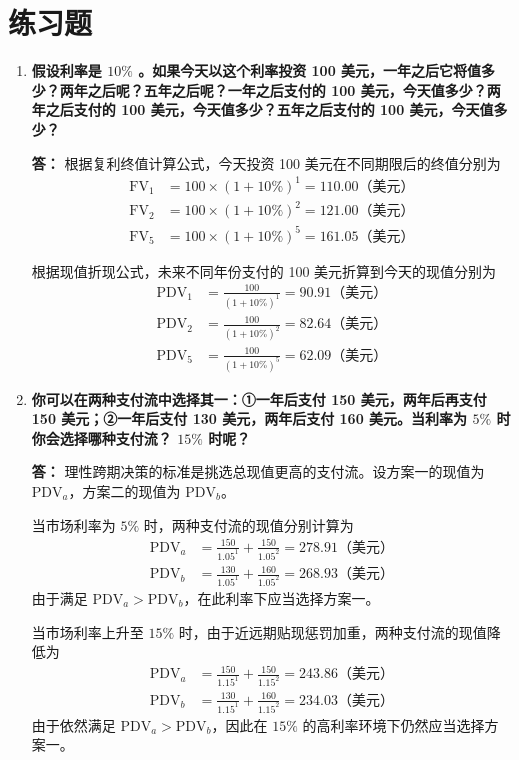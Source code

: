 	\section{练习题}
	\begin{enumerate}[label=\textbf{\arabic*.}, leftmargin=*]
		\item \textbf{假设利率是 $10\%$ 。如果今天以这个利率投资 100 美元，一年之后它将值多少？两年之后呢？五年之后呢？一年之后支付的 100 美元，今天值多少？两年之后支付的 100 美元，今天值多少？五年之后支付的 100 美元，今天值多少？}
		
		\textbf{答：}
		根据复利终值计算公式，今天投资 100 美元在不同期限后的终值分别为
		\[
		\begin{aligned}
			\text{FV}_1 &= 100 \times (1 + 10\%)^1 = 110.00 \text{（美元）} \\
			\text{FV}_2 &= 100 \times (1 + 10\%)^2 = 121.00 \text{（美元）} \\
			\text{FV}_5 &= 100 \times (1 + 10\%)^5 = 161.05 \text{（美元）}
		\end{aligned}
		\]
		
		根据现值折现公式，未来不同年份支付的 100 美元折算到今天的现值分别为
		\[
		\begin{aligned}
			\text{PDV}_1 &= \frac{100}{(1 + 10\%)^1} = 90.91 \text{（美元）} \\
			\text{PDV}_2 &= \frac{100}{(1 + 10\%)^2} = 82.64 \text{（美元）} \\
			\text{PDV}_5 &= \frac{100}{(1 + 10\%)^5} = 62.09 \text{（美元）}
		\end{aligned}
		\]
		
		\item \textbf{你可以在两种支付流中选择其一：①一年后支付 150 美元，两年后再支付 150 美元；②一年后支付 130 美元，两年后支付 160 美元。当利率为 $5\%$ 时你会选择哪种支付流？ $15\%$ 时呢？}
		
		\textbf{答：}
		理性跨期决策的标准是挑选总现值更高的支付流。设方案一的现值为 $\text{PDV}_a$，方案二的现值为 $\text{PDV}_b$。
		
		当市场利率为 $5\%$ 时，两种支付流的现值分别计算为
		\[
		\begin{aligned}
			\text{PDV}_a &= \frac{150}{1.05^1} + \frac{150}{1.05^2} = 278.91 \text{（美元）} \\
			\text{PDV}_b &= \frac{130}{1.05^1} + \frac{160}{1.05^2} = 268.93 \text{（美元）}
		\end{aligned}
		\]
		由于满足 $\text{PDV}_a > \text{PDV}_b$，在此利率下应当选择方案一。
		
		当市场利率上升至 $15\%$ 时，由于近远期贴现惩罚加重，两种支付流的现值降低为
		\[
		\begin{aligned}
			\text{PDV}_a &= \frac{150}{1.15^1} + \frac{150}{1.15^2} = 243.86 \text{（美元）} \\
			\text{PDV}_b &= \frac{130}{1.15^1} + \frac{160}{1.15^2} = 234.03 \text{（美元）}
		\end{aligned}
		\]
		由于依然满足 $\text{PDV}_a > \text{PDV}_b$，因此在 $15\%$ 的高利率环境下仍然应当选择方案一。
		

\end{enumerate}
